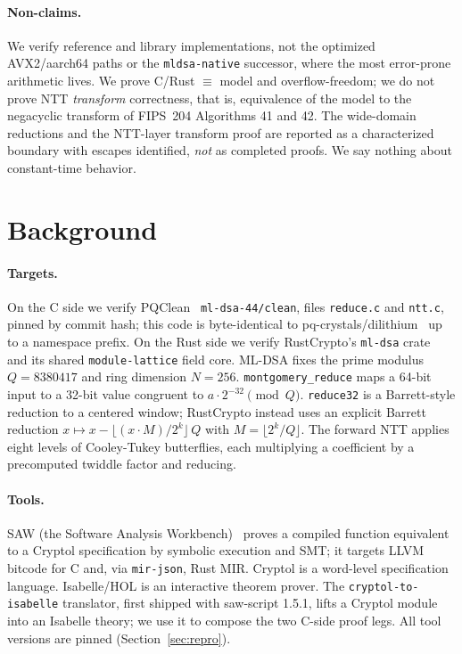 \documentclass[11pt]{article}
\newcommand{\code}[1]{\texttt{#1}}
\begin{document}
\paragraph{Non-claims.} We verify reference and library implementations, not the optimized
AVX2/aarch64 paths or the \code{mldsa-native} successor, where the most error-prone arithmetic lives. We
prove C/Rust $\equiv$ model and overflow-freedom; we do not prove NTT \emph{transform} correctness, that
is, equivalence of the model to the negacyclic transform of FIPS~204 Algorithms 41 and 42. The
wide-domain reductions and the NTT-layer transform proof are reported as a characterized boundary with
escapes identified, \emph{not} as completed proofs. We say nothing about constant-time behavior.

\section{Background}\label{sec:background}

\paragraph{Targets.} On the C side we verify PQClean~\cite{pqclean} \code{ml-dsa-44/clean}, files
\code{reduce.c} and \code{ntt.c}, pinned by commit hash; this code is byte-identical to
pq-crystals/dilithium~\cite{dilithium} up to a namespace prefix. On the Rust side we verify
RustCrypto's \code{ml-dsa} crate~\cite{rustcrypto} and its shared \code{module-lattice} field core. ML-DSA
fixes the prime modulus $Q = 8380417$ and ring dimension $N = 256$. \code{montgomery\_reduce} maps a
64-bit input to a 32-bit value congruent to $a \cdot 2^{-32} \pmod Q$. \code{reduce32} is a
Barrett-style reduction to a centered window; RustCrypto instead uses an explicit Barrett reduction
$x \mapsto x - \lfloor (x \cdot M) / 2^{k} \rfloor\, Q$ with $M = \lfloor 2^{k}/Q \rfloor$. The forward
NTT applies eight levels of Cooley-Tukey butterflies, each multiplying a coefficient by a precomputed
twiddle factor and reducing.

\paragraph{Tools.} SAW (the Software Analysis Workbench)~\cite{saw} proves a compiled function
equivalent to a Cryptol specification by symbolic execution and SMT; it targets LLVM bitcode for C and,
via \code{mir-json}, Rust MIR. Cryptol is a word-level specification language. Isabelle/HOL is an
interactive theorem prover. The \code{cryptol-to-isabelle} translator, first shipped with saw-script
1.5.1, lifts a Cryptol module into an Isabelle theory; we use it to compose the two C-side proof legs.
All tool versions are pinned (Section~\ref{sec:repro}).
\end{document}

